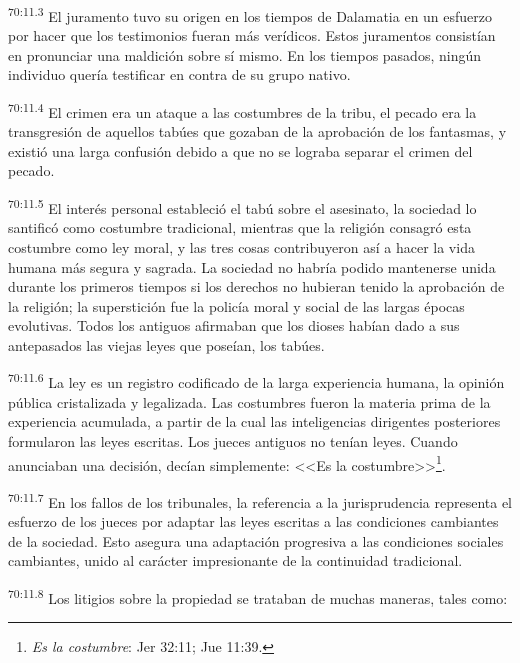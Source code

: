 \documentclass[twoside, 11pt]{book}
\begin{document}
\par
\textsuperscript{70:11.3} El juramento tuvo su origen en los tiempos de Dalamatia en un esfuerzo por hacer que los testimonios fueran más verídicos. Estos juramentos consistían en pronunciar una maldición sobre sí mismo. En los tiempos pasados, ningún individuo quería testificar en contra de su grupo nativo.

\par
\textsuperscript{70:11.4} El crimen era un ataque a las costumbres de la tribu, el pecado era la transgresión de aquellos tabúes que gozaban de la aprobación de los fantasmas, y existió una larga confusión debido a que no se lograba separar el crimen del pecado.

\par
\textsuperscript{70:11.5} El interés personal estableció el tabú sobre el asesinato, la sociedad lo santificó como costumbre tradicional, mientras que la religión consagró esta costumbre como ley moral, y las tres cosas contribuyeron así a hacer la vida humana más segura y sagrada. La sociedad no habría podido mantenerse unida durante los primeros tiempos si los derechos no hubieran tenido la aprobación de la religión; la superstición fue la policía moral y social de las largas épocas evolutivas. Todos los antiguos afirmaban que los dioses habían dado a sus antepasados las viejas leyes que poseían, los tabúes.

\par
\textsuperscript{70:11.6} La ley es un registro codificado de la larga experiencia humana, la opinión pública cristalizada y legalizada. Las costumbres fueron la materia prima de la experiencia acumulada, a partir de la cual las inteligencias dirigentes posteriores formularon las leyes escritas. Los jueces antiguos no tenían leyes. Cuando anunciaban una decisión, decían simplemente: <<Es la costumbre>>\footnote{\textit{Es la costumbre}: Jer 32:11; Jue 11:39.}.

\par
\textsuperscript{70:11.7} En los fallos de los tribunales, la referencia a la jurisprudencia representa el esfuerzo de los jueces por adaptar las leyes escritas a las condiciones cambiantes de la sociedad. Esto asegura una adaptación progresiva a las condiciones sociales cambiantes, unido al carácter impresionante de la continuidad tradicional.

\par
\textsuperscript{70:11.8} Los litigios sobre la propiedad se trataban de muchas maneras, tales como:
\end{document}
